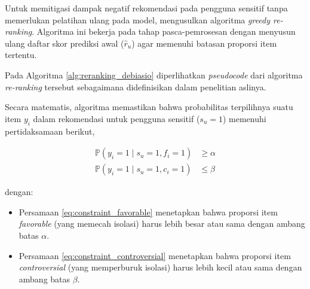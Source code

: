 Untuk memitigasi dampak negatif rekomendasi pada pengguna sensitif tanpa memerlukan pelatihan ulang pada model, \textcite{DeBiasio2023} mengusulkan algoritma \textit{greedy re-ranking}. Algoritma ini bekerja pada tahap pasca-pemrosesan dengan menyusun ulang daftar skor prediksi awal ($\hat{r}_u$) agar memenuhi batasan proporsi item tertentu.

Pada Algoritma \ref{alg:reranking_debiasio} diperlihatkan \textit{pseudocode} dari algoritma \textit{re-ranking} tersebut sebagaimana didefinisikan dalam penelitian aslinya.



Secara matematis, algoritma memastikan bahwa probabilitas terpilihnya
suatu item $y_i$ dalam rekomendasi untuk pengguna sensitif ($s_u=1$) memenuhi
pertidaksamaan berikut,

\begin{align}
    \mathbb{P}(y_i=1 \mid s_u=1, f_i=1) &\geq \alpha \label{eq:constraint_favorable} \\
    \mathbb{P}(y_i=1 \mid s_u=1, c_i=1) &\leq \beta \label{eq:constraint_controversial}
\end{align}

dengan:
\begin{itemize}
    \item Persamaan \eqref{eq:constraint_favorable} menetapkan bahwa proporsi
    item \textit{favorable} (yang memecah isolasi) harus lebih besar atau sama
    dengan ambang batas $\alpha$.
    \item Persamaan \eqref{eq:constraint_controversial} menetapkan bahwa proporsi
    item \textit{controversial} (yang memperburuk isolasi) harus lebih kecil
    atau sama dengan ambang batas $\beta$.
\end{itemize}

